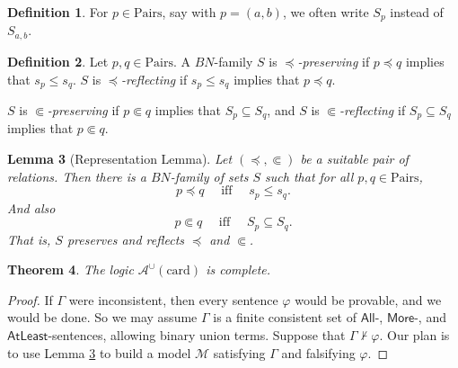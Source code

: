 \documentclass[letterpaper]{article} %
\newtheorem{theorem}{Theorem}[section]
\newtheorem{lemma}[theorem]{Lemma}
\theoremstyle{definition}
\newtheorem{definition}[theorem]{Definition}
\newcommand{\Model}{\mathcal{M}}
\newcommand{\proves}{\vdash}
\newcommand{\quadiff}{\quad \mbox{ iff } \quad}
\newcommand{\Aunion}{\mathscr{A}^{\cup}}
\newcommand{\AllNoArgs}{\mathsf{All}}
\newcommand{\AtleastNoArgs}{\mathsf{AtLeast}}
\newcommand{\MoreNoArgs}{\mathsf{More}}
\newcommand{\card}{\mathrm{card}}
\newcommand{\Pairs}{\mbox{Pairs}}
\newcommand{\precsubseteq}{\Subset}
\begin{document}
{\begin{definition}
For $p\in\Pairs$, say with $p= (a,b)$, we often write $S_p$ instead of $S_{a,b}$.
\end{definition}

\begin{definition}
Let $p,q\in \Pairs$.
A $BN$-family $S$ is \emph{$\preceq$-preserving} if 
$p \preceq q$ implies that $s_{p} \le s_{q}$.  $S$ is \emph{$\preceq$-reflecting} if $s_{p} \le s_{q}$ implies that $p \preceq q$.


 $S$ is \emph{$\precsubseteq$-preserving}
if $p \precsubseteq q$ implies that $S_{p} \subseteq S_{q}$, and 
$S$ is \emph{$\precsubseteq$-reflecting} if 
$S_{p} \subseteq S_{q}$ implies that $p \precsubseteq  q$. 
\end{definition}


\begin{lemma} [Representation Lemma]
Let $(\preceq, \precsubseteq)$ be a suitable pair of relations.
Then there is a $BN$-family of sets $S$
such that for all $p,q\in\Pairs$,
\begin{equation}
    \label{goal-main1}
p \preceq q \quadiff 
 s_{p}\leq s_q.
 \end{equation}
 And also
 \begin{equation}
    \label{goal-main2}
 p \precsubseteq  q \quadiff 
S_{p}\subseteq S_{q}.
 \end{equation}
 That is, $S$ preserves and reflects $\preceq$ and $\precsubseteq$.
 \label{lemma-representation}
 \end{lemma}

\begin{theorem}
    The logic $\Aunion(\card)$ is complete.
    \label{theorem-completeness-Aunioncard}
\end{theorem}
\begin{proof}
If $\Gamma$ were inconsistent, then every sentence $\varphi$ would be provable, and 
we would be done.  So we may assume $\Gamma$ is a  finite consistent
 set of $\AllNoArgs$-, $\MoreNoArgs$-, and $\AtleastNoArgs$-sentences,  allowing binary union terms.
Suppose that $\Gamma \not \proves \varphi$.  Our plan is to use Lemma \ref{lemma-representation} to build a model $\Model$ 
satisfying $\Gamma$ and falsifying $\varphi$.


\end{proof}}
\end{document}
